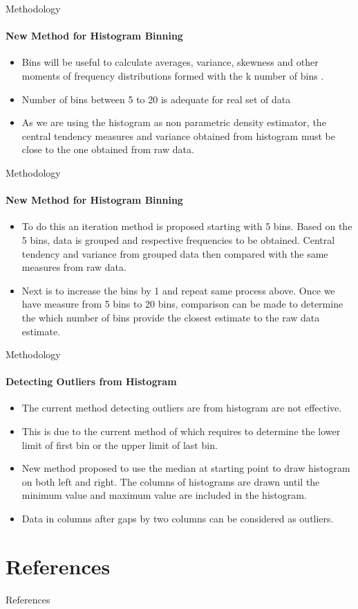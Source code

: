 \documentclass{beamer}
\begin{document}
\begin{frame}{Methodology}
\framesubtitle{New Method for Histogram Binning}
\begin{itemize}
	\item Bins will be useful to calculate averages, variance, skewness and other moments of frequency distributions formed with the k number of bins \cite{sturges1926choice} .
	
	\item Number of bins between 5 to 20 is adequate for real set of data \cite{scott1979optimal}  
	
	\item As we are using the histogram as non parametric density estimator,  the central tendency measures and variance obtained from histogram must be close to the one obtained from raw data.
		
\end{itemize}
\end{frame}

\begin{frame}{Methodology}
\framesubtitle{New Method for Histogram Binning}
\begin{itemize}

	\item To do this an iteration method is proposed starting with 5 bins. Based on the 5 bins, data is grouped and respective frequencies to be obtained. Central tendency and variance from grouped data then compared with the same measures from raw data. 
	
	\item Next is to increase the bins by 1 and repeat same process above. Once we have measure from 5 bins to 20 bins, comparison can be made to determine the which number of bins provide the closest estimate to the raw data estimate. 
	
	
\end{itemize}
\end{frame}

\begin{frame}{Methodology}
\framesubtitle{Detecting Outliers from Histogram}
\begin{itemize}
	
	\item The current method detecting outliers are from histogram are not effective.
	
	\item This is due to the current method of which requires to determine the lower limit of first bin or the upper limit of last bin.
	
	\item New method proposed to use the median at starting point to draw histogram on both left and right. The columns of histograms are drawn until the minimum value and maximum value are included in the histogram.
	
	\item Data in columns after gaps by two columns can be considered as outliers.
	
\end{itemize}
\end{frame}

\section{References}
	\begin{frame}[allowframebreaks]{References}
		
		
	\end{frame}
\end{document}
